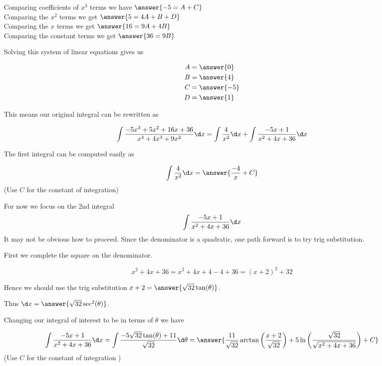 \documentclass{ximera}
\begin{document}
\begin{exercise}
\begin{exercise}
\begin{exercise}
Comparing coefficients of $x^{3}$ terms we have $\answer{-5=A+C}$ \\
Comparing the $x^{2}$ terms we get $\answer {5=4A+B+D}$ \\
Comparing the $x$ terms we get $\answer{16=9A+4B}$ \\
Comparing the constant terms we get $\answer{36=9B}$ 

\begin{exercise}
Solving this system of linear equations gives us

\begin{align}
A&=\answer{  0 }\\
B&=\answer{4   }\\
C&=\answer{  -5 }\\
D&=\answer{1    }
\end{align}

\begin{exercise}
This means our original integral can be rewritten as 

\[
\int \frac{-5x^{3}+5x^{2}+16x+36}{x^{4}+4x^{3}+9x^{2}} \d x= \int \frac{4}{x^{2}} \d x + \int \frac{-5x+1}{x^{2}+4x+36} \d x 
\]

The first integral can be computed easily as

\[
\int \frac{4}{x^{2}} \d x=\answer{\frac{-4}{x}+C}
\]
(Use $C$ for the constant of integration)

\begin{exercise}

For now we focus on the 2nd integral 
\[
\int \frac{-5x+1}{x^{2}+4x+36} \d x 
\]
It may not be obvious how to proceed. Since the denominator is a quadratic, one path forward is to try trig substitution.

\begin{exercise}

First we complete the square on the denominator. 

\[
x^{2}+4x+36=x^{2}+4x+4-4+36=(x+2)^{2}+32
\]

Hence we should use the trig substitution $x+2=\answer{\sqrt{32}\tan(\theta)}$. 

Thus $\d x=\answer{ \sqrt{32} \sec^{2}(\theta)}$. 

\begin{exercise}
Changing our integral of interest to be in terms of $\theta$ we have

\[
\int \frac{-5x+1}{x^{2}+4x+36} \d x =\int   \frac{-5\sqrt{32}\tan(\theta)+11}{\sqrt{32}}  \d \theta=\answer{\frac{11}{\sqrt{32}}\arctan\left(\frac{x+2}{\sqrt{32}}\right)
+ 5\ln\left(\frac{\sqrt{32}}{\sqrt{x^{2}+4x+36}}\right) + C}
\]
(Use $C$ for the constant of integration )



\end{exercise}
\end{exercise}
\end{exercise}
\end{exercise}
\end{exercise}
\end{exercise}
\end{exercise}
\end{exercise}
\end{document}
